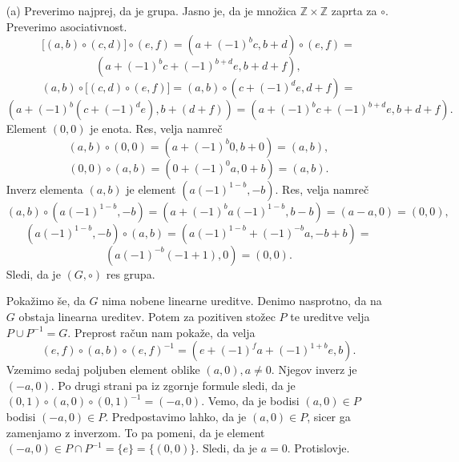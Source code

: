 \documentclass[a4paper, 12pt]{article}
\newcommand{\Z}{\mathbb{Z}}
\begin{document}
\begin{enumerate}
\item[(a)] Preverimo najprej, da je grupa. Jasno je, da je množica $\Z \times \Z$ zaprta za $\circ$. Preverimo asociativnost.
$$
\big[(a,b)\circ (c,d)\big] \circ (e,f) = (a+(-1)^b c, b+d) \circ (e,f) =
$$
$$
(a+(-1)^b c+ (-1)^{b+d}e, b+d+f),
$$
$$
(a,b)\circ \big[ (c,d) \circ (e,f) \big] = (a,b) \circ (c+(-1)^d e, d+f) =
$$
$$
(a+(-1)^b (c+(-1)^de), b+(d+f)) = (a+ (-1)^b c + (-1)^{b+d} e, b+d+f).
$$
Element $(0,0)$ je enota. Res, velja namreč
$$
(a,b)\circ (0,0) = (a+(-1)^b 0, b+0) = (a,b),
$$
$$
(0,0) \circ (a,b) = (0+(-1)^0 a, 0+b) = (a,b). 
$$
Inverz elementa $(a,b)$ je element $(a(-1)^{1-b},-b)$. Res, velja namreč
$$
(a,b) \circ (a(-1)^{1-b},-b) = (a+(-1)^b a (-1)^{1-b}, b-b) = (a-a,0 )= (0,0),
$$
$$
(a(-1)^{1-b}, -b) \circ (a,b) = (a(-1)^{1-b}+(-1)^{-b}a,-b+b)=
$$
$$
(a(-1)^{-b}(-1+1),0 ) = (0,0).
$$
Sledi, da je $(G,\circ)$ res grupa.

Pokažimo še, da $G$ nima nobene linearne ureditve. Denimo nasprotno, da na $G$ obstaja linearna ureditev. Potem za pozitiven stožec $P$ te ureditve velja $P\cup P^{-1} = G$. Preprost račun nam pokaže, da velja
$$
(e,f) \circ (a,b) \circ (e,f)^{-1} = (e+(-1)^f a + (-1)^{1+b} e,b).
$$
Vzemimo sedaj poljuben element oblike $(a,0), a\neq 0$. Njegov inverz je $(-a,0)$. Po drugi strani pa iz zgornje formule sledi, da je $(0,1)\circ(a,0)\circ (0,1)^{-1} = (-a,0)$. Vemo, da je bodisi $(a,0) \in P$ bodisi $(-a,0)\in P$. Predpostavimo lahko, da je $(a,0) \in P$, sicer ga zamenjamo z inverzom.  To pa pomeni, da je element $(-a,0) \in P\cap P^{-1} = \{e\} = \{(0,0)\}$. Sledi, da je $a=0$. Protislovje.


\end{enumerate}
\end{document}
